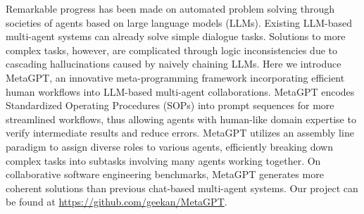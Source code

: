 Remarkable progress has been made on automated problem solving through societies of agents based on large language models (LLMs). Existing LLM-based multi-agent systems can already solve simple dialogue tasks. Solutions to more complex tasks, however, are complicated through logic inconsistencies due to cascading hallucinations caused by naively chaining LLMs. Here we introduce MetaGPT, an innovative meta-programming framework incorporating efficient human workflows into LLM-based multi-agent collaborations. MetaGPT encodes Standardized Operating Procedures (SOPs) into prompt sequences for more streamlined workflows, thus allowing agents with human-like domain expertise to verify intermediate results and reduce errors.  MetaGPT utilizes an assembly line paradigm to assign diverse roles to various agents, efficiently breaking down complex tasks into subtasks involving many agents working together.  On collaborative software engineering benchmarks, MetaGPT generates more coherent solutions than previous chat-based multi-agent systems. Our project can be found at \href{https://github.com/geekan/MetaGPT}{https://github.com/geekan/MetaGPT}.